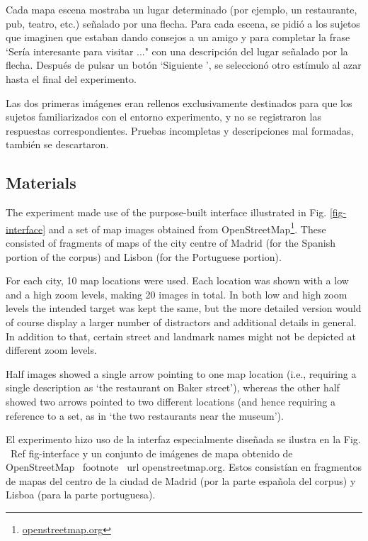 Cada mapa escena mostraba un lugar determinado (por ejemplo, un restaurante, pub, teatro, etc.) se\~nalado por una flecha. Para cada escena, se pidi\'o a los sujetos que imaginen que estaban dando consejos a un amigo y para completar la frase `Ser\'{i}a interesante para visitar ..." con una descripci\'on del lugar se\~nalado por la flecha. Despu\'es de pulsar un bot\'on `Siguiente ', se seleccion\'o otro est\'{i}mulo al azar hasta el final del experimento.

Las dos primeras im\'agenes eran rellenos exclusivamente destinados para que los sujetos familiarizados con el entorno experimento, y no se registraron las respuestas correspondientes. Pruebas incompletas y descripciones mal formadas, tambi\'en se descartaron.


\subsection{Materials}

The experiment made use of the purpose-built interface illustrated in Fig. \ref{fig-interface} and a set of map images obtained from OpenStreetMap\footnote{\url{openstreetmap.org}}. These consisted of fragments of maps of the city centre of Madrid (for the Spanish portion of the corpus) and Lisbon (for the Portuguese portion). 

For each city, 10 map locations were used. Each location was shown with a low and a high zoom levels, making 20 images in total. In both low and high zoom levels  the intended target was kept the same, but the more detailed version would of course display a larger number of distractors and additional details in general. In addition to that, certain street and landmark names might not be depicted at different zoom levels.

Half images showed a single arrow pointing to one map location (i.e., requiring a single description as `the restaurant on Baker street'), whereas the other half showed two arrows pointed to two different locations (and hence requiring a reference to a set, as in `the two restaurants near the museum'). 

El experimento hizo uso de la interfaz especialmente dise\~nada se ilustra en la Fig. \ Ref {fig-interface} y un conjunto de im\'agenes de mapa obtenido de OpenStreetMap \ footnote {\ url {openstreetmap.org}}. Estos consist\'{i}an en fragmentos de mapas del centro de la ciudad de Madrid (por la parte espa\~nola del corpus) y Lisboa (para la parte portuguesa).

